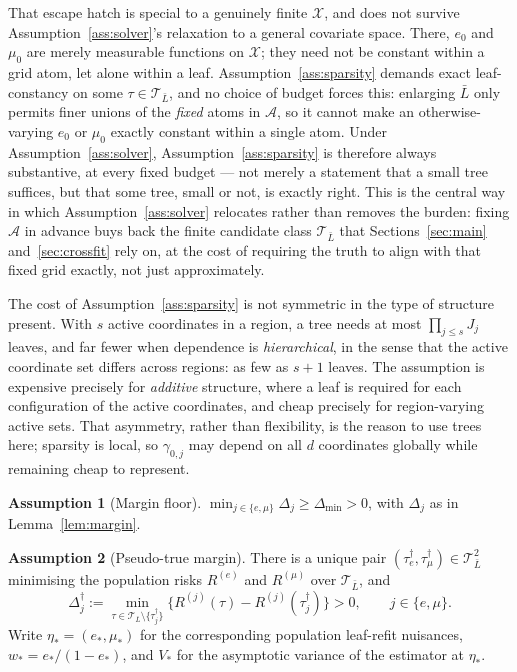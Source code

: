 \documentclass[11pt]{article}
\theoremstyle{plain}
\theoremstyle{definition}
\newtheorem{assumption}{Assumption}
\theoremstyle{remark}
\newcommand{\cX}{\mathcal{X}}
\newcommand{\cA}{\mathcal{A}}
\newcommand{\cT}{\mathcal{T}}
\begin{document}
That escape hatch is special to a genuinely finite $\cX$, and does not
survive Assumption~\ref{ass:solver}'s relaxation to a general covariate
space. There, $e_0$ and $\mu_0$ are merely measurable functions on $\cX$;
they need not be constant within a grid atom, let alone within a leaf.
Assumption~\ref{ass:sparsity} demands exact leaf-constancy on some
$\tau\in\cT_{\bar L}$, and no choice of budget forces this: enlarging
$\bar L$ only permits finer unions of the \emph{fixed} atoms in $\cA$, so it
cannot make an otherwise-varying $e_0$ or $\mu_0$ exactly constant within a
single atom. Under Assumption~\ref{ass:solver}, Assumption~\ref{ass:sparsity}
is therefore always substantive, at every fixed budget --- not merely a
statement that a small tree suffices, but that some tree, small or not, is
exactly right. This is the central way in which Assumption~\ref{ass:solver}
relocates rather than removes the burden: fixing $\cA$ in advance buys back
the finite candidate class $\cT_{\bar L}$ that Sections~\ref{sec:main}
and~\ref{sec:crossfit} rely on, at the cost of requiring the truth to align with
that fixed grid exactly, not just approximately.

The cost of Assumption~\ref{ass:sparsity} is not symmetric in the type of
structure present. With $s$ active coordinates in a region, a tree needs at most
$\prod_{j\le s}J_j$ leaves, and far fewer when dependence is
\emph{hierarchical}, in the sense that the active coordinate set differs across
regions: as few as $s+1$ leaves. The assumption is expensive precisely for
\emph{additive} structure, where a leaf is required for each configuration of
the active coordinates, and cheap precisely for region-varying active sets. That
asymmetry, rather than flexibility, is the reason to use trees here; sparsity is
local, so $\gamma_{0,j}$ may depend on all $d$ coordinates globally while
remaining cheap to represent.

\begin{assumption}[Margin floor]\label{ass:margin-floor}
$\min_{j\in\{e,\mu\}}\Delta_j\ge\Delta_{\min}>0$, with $\Delta_j$ as in
Lemma~\ref{lem:margin}.
\end{assumption}

\begin{assumption}[Pseudo-true margin]\label{ass:pseudo}
There is a unique pair $(\tau_e^\dagger,\tau_\mu^\dagger)\in\cT_{\bar L}^2$
minimising the population risks $R^{(e)}$ and $R^{(\mu)}$ over
$\cT_{\bar L}$, and
\[
  \Delta^\dagger_j:=\min_{\tau\in\cT_{\bar L}\setminus\{\tau_j^\dagger\}}
  \bigl\{R^{(j)}(\tau)-R^{(j)}(\tau^\dagger_j)\bigr\}>0,
  \qquad j\in\{e,\mu\}.
\]
Write $\eta_*=(e_*,\mu_*)$ for the corresponding population leaf-refit
nuisances, $w_*=e_*/(1-e_*)$, and $V_*$ for the asymptotic variance of the
estimator at $\eta_*$.
\end{assumption}
\end{document}
